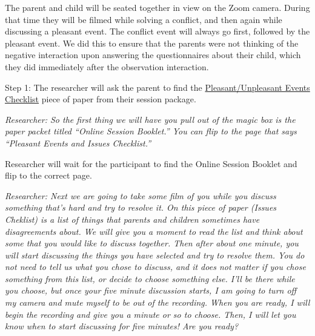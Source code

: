 \documentclass[]{book}
\begin{document}
The parent and child will be seated together in view on the Zoom camera. During that time they will be filmed while solving a conflict, and then again while discussing a pleasant event. The conflict event will always go first, followed by the pleasant event. We did this to ensure that the parents were not thinking of the negative interaction upon answering the questionnaires about their child, which they did immediately after the observation interaction.

Step 1:
The researcher will ask the parent to find the \href{https://ucla.app.box.com/file/630327764749}{Pleasant/Unpleasant Events Checklist} piece of paper from their session package.

\emph{Researcher: So the first thing we will have you pull out of the magic box is the paper packet titled ``Online Session Booklet.'' You can flip to the page that says ``Pleasant Events and Issues Checklist.''}

Researcher will wait for the participant to find the Online Session Booklet and flip to the correct page.

\emph{Researcher: Next we are going to take some film of you while you discuss something that's hard and try to resolve it. On this piece of paper (Issues Cheklist) is a list of things that parents and children sometimes have disagreements about. We will give you a moment to read the list and think about some that you would like to discuss together. Then after about one minute, you will start discussing the things you have selected and try to resolve them. You do not need to tell us what you chose to discuss, and it does not matter if you chose something from this list, or decide to choose something else. I'll be there while you choose, but once your five minute discussion starts, I am going to turn off my camera and mute myself to be out of the recording. When you are ready, I will begin the recording and give you a minute or so to choose. Then, I will let you know when to start discussing for five minutes! Are you ready?}
\end{document}
